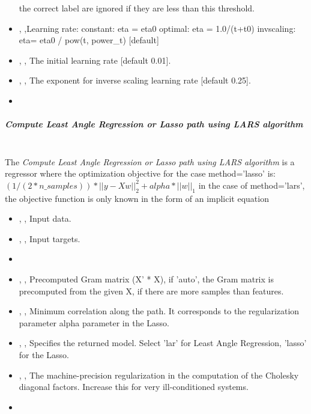 \begin{itemize}
  the correct label are ignored if they are less than this threshold.
  \item {} , ,Learning rate: constant: eta = eta0 optimal: eta = 1.0/(t+t0)
  invscaling: eta= eta0 / pow(t, power\_t) [default]
  \item {} , ,
  The initial learning rate [default 0.01].
  \item {} , ,
  The exponent for inverse scaling learning rate [default 0.25].
  \item \warmStartDescription{}
\end{itemize}

\subparagraph{Compute Least Angle Regression or Lasso path using LARS algorithm}
\mbox{}
\\The \textit{Compute Least Angle Regression or Lasso path using LARS algorithm}
is a regressor where the optimization objective for the case method=’lasso’
is:
$(1 / (2 * n\_samples)) * ||y - Xw||^2_2 + alpha * ||w||_1$
in the case of method=’lars’, the objective function is only known in the
form of an implicit equation
\begin{itemize}
  \item {} , ,
  Input data.
  \item {} , ,
  Input targets.
  \item {}
  \item {} , ,
  Precomputed Gram matrix (X’ * X), if 'auto', the Gram matrix is precomputed
  from the given X, if there are more samples than features.
  \item {} , ,
  Minimum correlation along the path.
  It corresponds to the regularization parameter alpha parameter in the Lasso.
  \item {} , ,
  Specifies the returned model.
  Select 'lar' for Least Angle Regression, 'lasso' for the Lasso.
  \item {} , ,
  The machine-precision regularization in the computation of the Cholesky
  diagonal factors.
  Increase this for very ill-conditioned systems.
  \item \verDescriptionB
\end{itemize}

